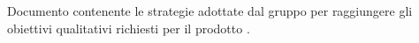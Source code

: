 Documento contenente le strategie adottate dal gruppo \textit{\gruppo} per raggiungere gli obiettivi qualitativi richiesti per il prodotto \textit{\progetto}.
